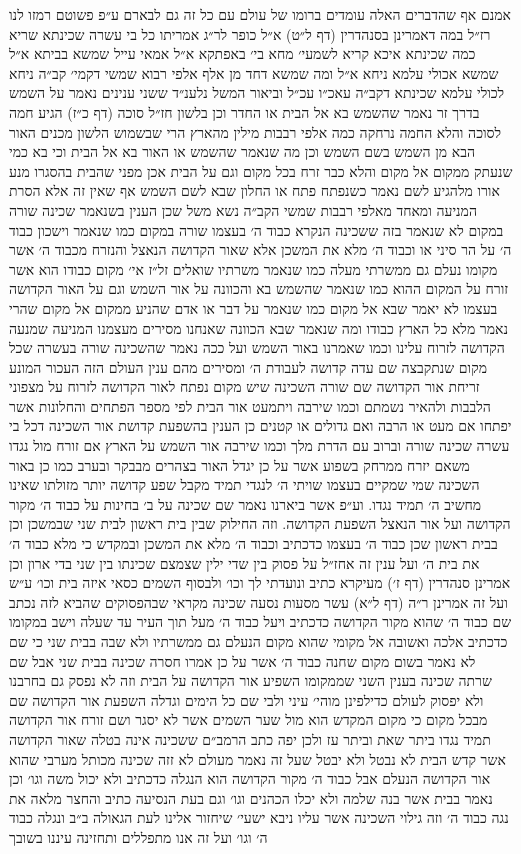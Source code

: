 \documentclass[12pt, openany]{book}
\begin{document}
\begin{multicols}{2}
אמנם אף שהדברים האלה עומדים ברומו של עולם עם כל זה גם לבארם ע״פ פשוטם רמזו לנו רז״ל במה דאמרינן בסנהדרין (דף ל״ט) א״ל כופר לר״ג אמריתו כל בי עשרה שכינתא שריא כמה שכינתא איכא קריא לשמעי׳ מחא בי׳ באפתקא א״ל אמאי עייל שמשא בביתא א״ל שמשא אכולי עלמא ניחא א״ל ומה שמשא דחד מן אלף אלפי רבוא שמשי דקמי׳ קב״ה ניחא לכולי עלמא שכינתא דקב״ה עאכ״ו עכ״ל וביאור המשל נלענ״ד ששני ענינים נאמר על השמש בדרך זר נאמר שהשמש בא אל הבית או החדר וכן בלשון חז״ל סוכה (דף כ״ז) הגיע חמה לסוכה והלא החמה נרחקה כמה אלפי רבבות מילין מהארץ הרי שבשמוש הלשון מכנים האור הבא מן השמש בשם השמש וכן מה שנאמר שהשמש או האור בא אל הבית וכי בא כמי שנעתק ממקום אל מקום והלא כבר זרח בכל מקום וגם על הבית אכן מפני שהבית בהסגרו מנע אורו מלהגיע לשם נאמר כשנפתח פתח או החלון שבא לשם השמש אף שאין זה אלא הסרת המניעה ומאחד מאלפי רבבות שמשי הקב״ה נשא משל שכן הענין בשנאמר שכינה שורה במקום לא שנאמר בזה ששכינה הנקרא כבוד ה׳ בעצמו שורה במקום כמו שנאמר וישכון כבוד ה׳ על הר סיני או וכבוד ה׳ מלא את המשכן אלא שאור הקדושה הנאצל והנזרח מכבוד ה׳ אשר מקומו נעלם גם ממשרתי מעלה כמו שנאמר משרתיו שואלים זל״ז אי׳ מקום כבודו הוא אשר זורח על המקום ההוא כמו שנאמר שהשמש בא והכוונה על אור השמש וגם על האור הקדושה בעצמו לא יאמר שבא אל מקום כמו שנאמר על דבר או אדם שהניע ממקום אל מקום שהרי נאמר מלא כל הארץ כבודו ומה שנאמר שבא הכוונה שאנחנו מסירים מעצמנו המניעה שמנעה הקדושה לזרוח עלינו וכמו שאמרנו באור השמש ועל ככה נאמר שהשכינה שורה בעשרה שכל מקום שנתקבצה שם עדה קדושה לעבודת ה׳ ומסירים מהם ענין העולם הזה העכור המונע זריחת אור הקדושה שם שורה השכינה שיש מקום נפתח לאור הקדושה לזרוח על מצפוני הלבבות ולהאיר נשמתם וכמו שירבה ויתמעט אור הבית לפי מספר הפתחים והחלונות אשר יפתחו אם מעט או הרבה ואם גדולים או קטנים כן הענין בהשפעת קדושת אור השכינה דכל בי עשרה שכינה שורה וברוב עם הדרת מלך וכמו שירבה אור השמש על הארץ אם זורח מול נגדו משאם יזרח ממרחק בשפוע אשר על כן יגדל האור בצהרים מבבקר ובערב כמו כן באור השכינה שמי שמקיים בעצמו שויתי ה׳ לנגדי תמיד מקבל שפע קדושה יותר מזולתו שאינו מחשיב ה׳ תמיד נגדו. וע״פ אשר ביארנו נאמר שם שכינה על ב׳ בחינות על כבוד ה׳ מקור הקדושה ועל אור הנאצל השפעת הקדושה. וזה החילוק שבין בית ראשון לבית שני שבמשכן וכן בבית ראשון שכן כבוד ה׳ בעצמו כדכתיב וכבוד ה׳ מלא את המשכן ובמקדש כי מלא כבוד ה׳ את בית ה׳ ועל ענין זה אחז״ל על פסוק בין שדי ילין שצמצם שכינתו בין שני בדי ארון וכן אמרינן סנהדרין (דף ז׳) מעיקרא כתיב ונועדתי לך וכו׳ ולבסוף השמים כסאי איזה בית וכו׳ ע״ש ועל זה אמרינן ר״ה (דף ל״א) עשר מסעות נסעה שכינה מקראי שבהפסוקים שהביא לזה נכתב שם כבוד ה׳ שהוא מקור הקדושה כדכתיב ויעל כבוד ה׳ מעל תוך העיר עד שעלה וישב במקומו כדכתיב אלכה ואשובה אל מקומי שהוא מקום הנעלם גם ממשרתיו ולא שבה בבית שני כי שם לא נאמר בשום מקום שחנה כבוד ה׳ אשר על כן אמרו חסרה שכינה בבית שני אבל שם שרתה שכינה בענין השני שממקומו השפיע אור הקדושה על הבית וזה לא נפסק גם בחרבנו ולא יפסוק לעולם כדילפינן מוהי׳ עיני ולבי שם כל הימים וגדלה השפעת אור הקדושה שם מבכל מקום כי מקום המקדש הוא מול שער השמים אשר לא יסגר ושם זורח אור הקדושה תמיד נגדו ביתר שאת וביתר עז ולכן יפה כתב הרמב״ם ששכינה אינה בטלה שאור הקדושה אשר קדש הבית לא נבטל ולא יבטל שעל זה נאמר מעולם לא זזה שכינה מכותל מערבי שהוא אור הקדושה הנעלם אבל כבוד ה׳ מקור הקדושה הוא הנגלה כדכתיב ולא יכול משה וגו׳ וכן נאמר בבית אשר בנה שלמה ולא יכלו הכהנים וגו׳ וגם בעת הנסיעה כתיב והחצר מלאה את נגה כבוד ה׳ וזה גילוי השכינה אשר עליו ניבא ישעי׳ שיחזור אלינו לעת הגאולה ב״ב ונגלה כבוד ה׳ וגו׳ ועל זה אנו מתפללים ותחזינה עיננו בשובך 
\end{multicols}
\end{document}
